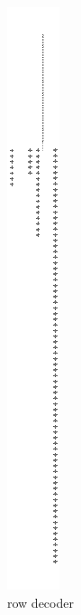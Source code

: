 \begin{figure}[h]
\begin{subfigure}{0.5\linewidth}
\centering
\includegraphics[]{rowdecoder_schematic.png}
\caption{row decoder}
\label{fig:Figure}
\end{subfigure}
\begin{subfigure}{0.5\linewidth}
\centering

\end{subfigure}
\end{figure}

